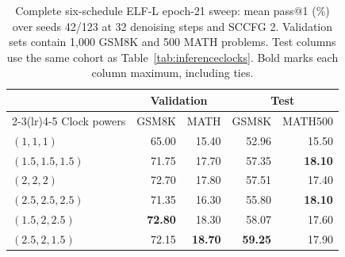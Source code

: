 \begin{table}[htbp]
\centering\small
\begin{tabular}{lrrrr}
\toprule
& \multicolumn{2}{c}{Validation} & \multicolumn{2}{c}{Test} \\
\cmidrule(lr){2-3}\cmidrule(lr){4-5}
Clock powers & GSM8K & MATH & GSM8K & MATH500 \\
\midrule
$(1,1,1)$ & 65.00 & 15.40 & 52.96 & 15.50 \\
$(1.5,1.5,1.5)$ & 71.75 & 17.70 & 57.35 & \textbf{18.10} \\
$(2,2,2)$ & 72.70 & 17.80 & 57.51 & 17.40 \\
$(2.5,2.5,2.5)$ & 71.35 & 16.30 & 55.80 & \textbf{18.10} \\
$(1.5,2,2.5)$ & \textbf{72.80} & 18.30 & 58.07 & 17.60 \\
$(2.5,2,1.5)$ & 72.15 & \textbf{18.70} & \textbf{59.25} & 17.90 \\
\bottomrule
\end{tabular}
\caption{Complete six-schedule ELF-L epoch-21 sweep: mean pass@1 (\%) over seeds 42/123 at 32 denoising steps and SCCFG 2. Validation sets contain 1,000 GSM8K and 500 MATH problems. Test columns use the same cohort as Table~\ref{tab:inferenceclocks}. Bold marks each column maximum, including ties.}
\label{tab:inferenceclockfull}
\end{table}
